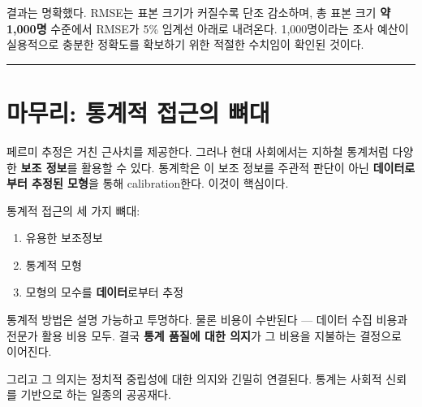 \documentclass[
  letterpaper,
  DIV=11,
  numbers=noendperiod]{scrreprt}
\providecommand{\tightlist}{%
  \setlength{\itemsep}{0pt}\setlength{\parskip}{0pt}}
\begin{document}
결과는 명확했다. RMSE는 표본 크기가 커질수록 단조 감소하며, 총 표본 크기
\textbf{약 1,000명} 수준에서 RMSE가 5\% 임계선 아래로 내려온다.
1,000명이라는 조사 예산이 실용적으로 충분한 정확도를 확보하기 위한
적절한 수치임이 확인된 것이다.

\begin{center}\rule{0.5\linewidth}{0.5pt}\end{center}

\section{마무리: 통계적 접근의
뼈대}\label{uxb9c8uxbb34uxb9ac-uxd1b5uxacc4uxc801-uxc811uxadfcuxc758-uxbf08uxb300}

페르미 추정은 거친 근사치를 제공한다. 그러나 현대 사회에서는 지하철
통계처럼 다양한 \textbf{보조 정보}를 활용할 수 있다. 통계학은 이 보조
정보를 주관적 판단이 아닌 \textbf{데이터로부터 추정된 모형}을 통해
calibration한다. 이것이 핵심이다.

통계적 접근의 세 가지 뼈대:

\begin{enumerate}
\def\labelenumi{\arabic{enumi}.}
\tightlist
\item
  유용한 보조정보
\item
  통계적 모형
\item
  모형의 모수를 \textbf{데이터}로부터 추정
\end{enumerate}

\begin{tcolorbox}[enhanced jigsaw, arc=.35mm, bottomrule=.15mm, bottomtitle=1mm, breakable, colback=white, colbacktitle=quarto-callout-tip-color!10!white, colframe=quarto-callout-tip-color-frame, coltitle=black, left=2mm, leftrule=.75mm, opacityback=0, opacitybacktitle=0.6, rightrule=.15mm, title=\textcolor{quarto-callout-tip-color}{\faLightbulb}\hspace{0.5em}{통계학자의 관점}, titlerule=0mm, toprule=.15mm, toptitle=1mm]

통계적 방법은 설명 가능하고 투명하다. 물론 비용이 수반된다 --- 데이터
수집 비용과 전문가 활용 비용 모두. 결국 \textbf{통계 품질에 대한 의지}가
그 비용을 지불하는 결정으로 이어진다.

그리고 그 의지는 정치적 중립성에 대한 의지와 긴밀히 연결된다. 통계는
사회적 신뢰를 기반으로 하는 일종의 공공재다.

\end{tcolorbox}

\end{document}
